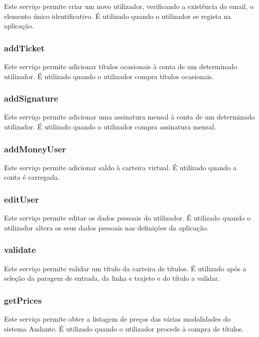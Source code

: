 Este serviço permite criar um novo utilizador, verificando a existência do email, o elemento único identificativo. É utilizado quando o utilizador se regista na aplicação.

\subsubsection{addTicket}

Este serviço permite adicionar títulos ocasionais à conta de um determinado utilizador. É utilizado quando o utilizador compra títulos ocasionais.

\subsubsection{addSignature}

Este serviço permite adicionar uma assinatura mensal à conta de um determinado utilizador. É utilizado quando o utilizador compra assinatura mensal.

\subsubsection{addMoneyUser}

Este serviço permite adicionar saldo à carteira virtual. É utilizado quando a conta é carregada.

\subsubsection{editUser}

Este serviço permite editar os dados pessoais do utilizador. É utilizado quando o utilizador altera os seus dados pessoais nas definições da aplicação.

\subsubsection{validate}

Este serviço permite validar um título da carteira de títulos. É utilizado após a seleção da paragem de entrada, da linha e trajeto e do título a validar.

\subsubsection{getPrices}

Este serviço permite obter a listagem de preços das várias modalidades do sistema Andante. É utilizado quando o utilizador procede à compra de títulos.

